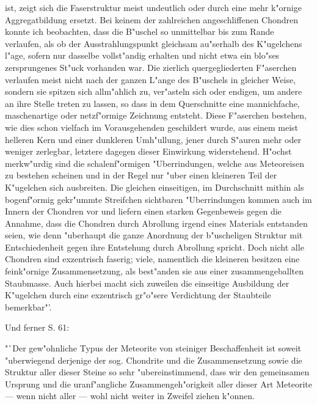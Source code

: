 \documentclass[a4paper, 11pt, oneside]{article}
\begin{document}
ist, zeigt sich die Faserstruktur meist undeutlich oder durch eine mehr k"ornige Aggregatbildung ersetzt. Bei keinem der zahlreichen angeschliffenen Chondren konnte ich beobachten, dass die B"uschel so unmittelbar bis zum Rande verlaufen, als ob der Ausstrahlungspunkt gleichsam au"serhalb des K"ugelchens l"age, sofern nur dasselbe vollst"andig erhalten und nicht etwa ein blo"ses zersprungenes St"uck vorhanden war. Die zierlich quergegliederten F"aserchen verlaufen meist nicht nach der ganzen L"ange des B"uschels in gleicher Weise, sondern sie spitzen sich allm"ahlich zu, ver"asteln sich oder endigen, um andere an ihre Stelle treten zu lassen, so dass in dem Querschnitte eine mannichfache, maschenartige oder netzf"ormige Zeichnung entsteht. Diese F"aserchen bestehen, wie dies schon vielfach im Vorausgehenden geschildert wurde, aus einem meist helleren Kern und einer dunkleren Umh"ullung, jener durch S"auren mehr oder weniger zerlegbar, letztere dagegen dieser Einwirkung widerstehend. H"ochst merkw"urdig sind die schalenf"ormigen "Uberrindungen, welche aus Meteoreisen zu bestehen scheinen und in der Regel nur "uber einen kleineren Teil der K"ugelchen sich ausbreiten. Die gleichen einseitigen, im Durchschnitt mithin als bogenf"ormig gekr"ummte Streifchen sichtbaren "Uberrindungen kommen auch im Innern der Chondren vor und liefern einen starken Gegenbeweis gegen die Annahme, dass die Chondren durch Abrollung irgend eines Materials entstanden seien, wie denn "uberhaupt die ganze Anordnung der b"uscheligen Struktur mit Entschiedenheit gegen ihre Entstehung durch Abrollung spricht. Doch nicht alle Chondren sind exzentrisch faserig; viele, namentlich die kleineren besitzen eine feink"ornige Zusammensetzung, als best"anden sie aus einer zusammengeballten Staubmasse. Auch hierbei macht sich zuweilen die einseitige Ausbildung der K"ugelchen durch eine exzentrisch gr"o"sere Verdichtung der Staubteile bemerkbar"'.

Und ferner S. 61:

"`Der gew"ohnliche Typus der Meteorite von steiniger Beschaffenheit ist soweit "uberwiegend derjenige der sog. Chondrite und die Zusammensetzung sowie die Struktur aller dieser Steine so sehr "ubereinstimmend, dass wir den gemeinsamen Ursprung und die uranf"angliche Zusammengeh"origkeit aller dieser Art Meteorite --- wenn nicht aller --- wohl nicht weiter in Zweifel ziehen k"onnen.
\end{document}
